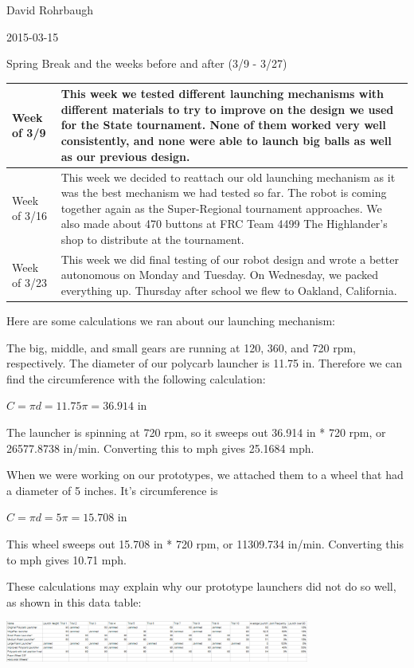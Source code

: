 David Rohrbaugh

2015-03-15

Spring Break and the weeks before and after (3/9 - 3/27)

\begin{tabular}{|p{5cm}|p{5cm}|}
 \hline
 Week of 3/9&
 This week we tested different launching mechanisms with different materials to try to improve on the design we used for the State tournament. None of them worked very well consistently, and none were able to launch big balls as well as our previous design.\\
\hline
 Week of 3/16&
 This week we decided to reattach our old launching mechanism as it was the best mechanism we had tested so far. The robot is coming together again as the Super-Regional tournament approaches. We also made about 470 buttons at FRC Team 4499 The Highlander's shop to distribute at the tournament.\\
\hline
 Week of 3/23&
 This week we did final testing of our robot design and wrote a better autonomous on Monday and Tuesday. On Wednesday, we packed everything up. Thursday after school we flew to Oakland, California.\\
 \hline
\end{tabular}

\medskip

Here are some calculations we ran about our launching mechanism:

The big, middle, and small gears are running at 120, 360, and 720 rpm, respectively. The diameter of our polycarb launcher is 11.75 in. Therefore we can find the circumference with the following calculation:

$C = \pi d = 11.75\pi = 36.914$ in

The launcher is spinning at 720 rpm, so it sweeps out 36.914 in * 720 rpm, or 26577.8738 in/min. Converting this to mph gives 25.1684 mph.

When we were working on our prototypes, we attached them to a wheel that had a diameter of 5 inches. It's circumference is

$C = \pi d = 5\pi = 15.708$ in

This wheel sweeps out 15.708 in * 720 rpm, or 11309.734 in/min. Converting this to mph gives 10.71 mph.

\pagebreak

These calculations may explain why our prototype launchers did not do so well, as shown in this data table:

\begin{center}
 \includegraphics[width = 10cm, angle=90]{./Entries/Images/launchData.png}
\end{center}

